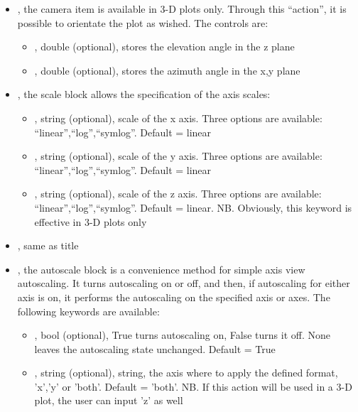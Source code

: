 \begin{itemize}
  \item {}, the camera item is available in 3-D plots only.
  Through this ``action'', it is possible to orientate the plot as wished.
  The controls are:
     \begin{itemize}
    \item \textit{}, double (optional), stores the elevation angle
    in the z plane
    \item \textit{}, double (optional), stores the azimuth angle in
    the x,y plane
      \end{itemize}
  \item {}, the scale block allows the specification of the axis scales:
     \begin{itemize}
    \item \textit{}, string (optional), scale of the x axis.
    Three options are available: ``linear'',``log'',``symlog''.
    Default = linear
    \item \textit{}, string (optional), scale of the y axis.
    Three options are available: ``linear'',``log'',``symlog''.
    Default = linear
    \item \textit{}, string (optional), scale of the z axis.
    Three options are available: ``linear'',``log'',``symlog''.
    Default = linear.
    NB.
    Obviously, this keyword is effective in 3-D plots only
      \end{itemize}
  \item {}, same as title
  \item {}, the autoscale block is a convenience method for simple
  axis view autoscaling.
  It turns autoscaling on or off, and then, if autoscaling for either axis is
  on, it performs the autoscaling on the specified axis or axes.
  The following keywords are available:
     \begin{itemize}
    \item \textit{}, bool (optional), True turns autoscaling on, False
    turns it off.
    None leaves the autoscaling state unchanged.
    Default = True
    \item \textit{}, string (optional), string, the axis where to apply
    the defined format, 'x','y' or 'both'.
    Default = 'both'.
    NB.
    If this action will be used in a 3-D plot, the user can input 'z' as well

\end{itemize}
\end{itemize}
